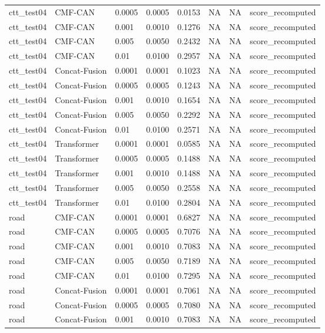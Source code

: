 \begin{tabular}{llllllll}
ctt_test04 & CMF-CAN & 0.0005 & 0.0005 & 0.0153 & NA & NA & score_recomputed \\
ctt_test04 & CMF-CAN & 0.001 & 0.0010 & 0.1276 & NA & NA & score_recomputed \\
ctt_test04 & CMF-CAN & 0.005 & 0.0050 & 0.2432 & NA & NA & score_recomputed \\
ctt_test04 & CMF-CAN & 0.01 & 0.0100 & 0.2957 & NA & NA & score_recomputed \\
ctt_test04 & Concat-Fusion & 0.0001 & 0.0001 & 0.1023 & NA & NA & score_recomputed \\
ctt_test04 & Concat-Fusion & 0.0005 & 0.0005 & 0.1243 & NA & NA & score_recomputed \\
ctt_test04 & Concat-Fusion & 0.001 & 0.0010 & 0.1654 & NA & NA & score_recomputed \\
ctt_test04 & Concat-Fusion & 0.005 & 0.0050 & 0.2292 & NA & NA & score_recomputed \\
ctt_test04 & Concat-Fusion & 0.01 & 0.0100 & 0.2571 & NA & NA & score_recomputed \\
ctt_test04 & Transformer & 0.0001 & 0.0001 & 0.0585 & NA & NA & score_recomputed \\
ctt_test04 & Transformer & 0.0005 & 0.0005 & 0.1488 & NA & NA & score_recomputed \\
ctt_test04 & Transformer & 0.001 & 0.0010 & 0.1488 & NA & NA & score_recomputed \\
ctt_test04 & Transformer & 0.005 & 0.0050 & 0.2558 & NA & NA & score_recomputed \\
ctt_test04 & Transformer & 0.01 & 0.0100 & 0.2804 & NA & NA & score_recomputed \\
road & CMF-CAN & 0.0001 & 0.0001 & 0.6827 & NA & NA & score_recomputed \\
road & CMF-CAN & 0.0005 & 0.0005 & 0.7076 & NA & NA & score_recomputed \\
road & CMF-CAN & 0.001 & 0.0010 & 0.7083 & NA & NA & score_recomputed \\
road & CMF-CAN & 0.005 & 0.0050 & 0.7189 & NA & NA & score_recomputed \\
road & CMF-CAN & 0.01 & 0.0100 & 0.7295 & NA & NA & score_recomputed \\
road & Concat-Fusion & 0.0001 & 0.0001 & 0.7061 & NA & NA & score_recomputed \\
road & Concat-Fusion & 0.0005 & 0.0005 & 0.7080 & NA & NA & score_recomputed \\
road & Concat-Fusion & 0.001 & 0.0010 & 0.7083 & NA & NA & score_recomputed \\

\end{tabular}
